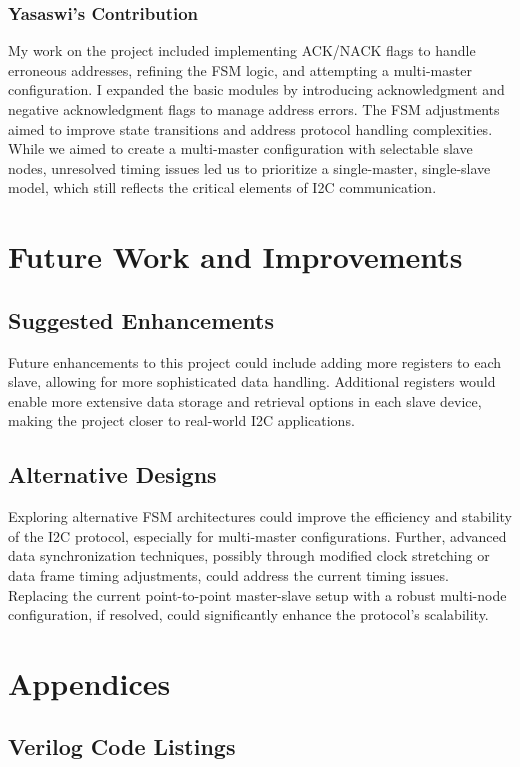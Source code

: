 \documentclass[a4paper,12pt]{report}
\begin{document}
\subsection*{Yasaswi’s Contribution}
My work on the project included implementing ACK/NACK flags to handle erroneous addresses, refining the FSM logic, and attempting a multi-master configuration. I expanded the basic modules by introducing acknowledgment and negative acknowledgment flags to manage address errors. The FSM adjustments aimed to improve state transitions and address protocol handling complexities. While we aimed to create a multi-master configuration with selectable slave nodes, unresolved timing issues led us to prioritize a single-master, single-slave model, which still reflects the critical elements of I2C communication.
\newpage
\chapter{Future Work and Improvements}

\section{Suggested Enhancements}
Future enhancements to this project could include adding more registers to each slave, allowing for more sophisticated data handling. Additional registers would enable more extensive data storage and retrieval options in each slave device, making the project closer to real-world I2C applications.

\section{Alternative Designs}
Exploring alternative FSM architectures could improve the efficiency and stability of the I2C protocol, especially for multi-master configurations. Further, advanced data synchronization techniques, possibly through modified clock stretching or data frame timing adjustments, could address the current timing issues. Replacing the current point-to-point master-slave setup with a robust multi-node configuration, if resolved, could significantly enhance the protocol's scalability.

\newpage
\chapter{Appendices}

\section{Verilog Code Listings}
\end{document}
